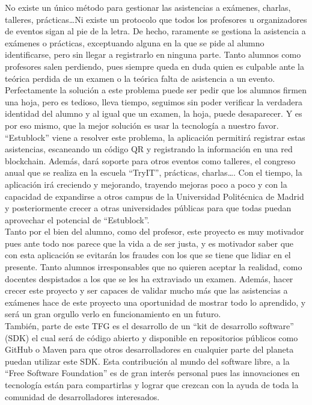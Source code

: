   No existe un único método para gestionar las asistencias a exámenes, charlas, talleres, prácticas\dots Ni existe un protocolo que todos los profesores u organizadores de eventos sigan al pie de la letra. De hecho, raramente se gestiona la asistencia a exámenes o prácticas, exceptuando alguna en la que se pide al alumno identificarse, pero sin llegar a registrarlo en ninguna parte. Tanto alumnos como profesores salen perdiendo, pues siempre queda en duda quien es culpable ante la teórica perdida de un examen o la teórica falta de asistencia a un evento. Perfectamente la solución a este problema puede ser pedir que los alumnos firmen una hoja, pero es tedioso, lleva tiempo, seguimos sin poder verificar la verdadera identidad del alumno y al igual que un examen, la hoja, puede desaparecer. Y es por eso mismo, que la mejor solución es usar la tecnología a nuestro favor. \\

``Estublock'' viene a resolver este problema, la aplicación permitirá registrar estas asistencias, escaneando un código QR y registrando la información en una red blockchain. Además, dará soporte para otros eventos como talleres, el congreso anual que se realiza en la escuela ``TryIT'', prácticas, charlas\dots. Con el tiempo, la aplicación irá creciendo y mejorando, trayendo mejoras poco a poco y con la capacidad de expandirse a otros campus de la Universidad Politécnica de Madrid y posteriormente crecer a otras universidades públicas para que todas puedan aprovechar el potencial de ``Estublock''. \\

Tanto por el bien del alumno, como del profesor, este proyecto es muy motivador pues ante todo nos parece que la vida a de ser justa, y es motivador saber que con esta aplicación se evitarán los fraudes con los que se tiene que lidiar en el presente. Tanto alumnos irresponsables que no quieren aceptar la realidad, como docentes despistados a los que se les ha extraviado un examen. Además, hacer crecer este proyecto y ser capaces de validar mucho más que las asistencias a exámenes hace de este proyecto una oportunidad de mostrar todo lo aprendido, y será un gran orgullo verlo en funcionamiento en un futuro. \\

También, parte de este TFG es el desarrollo de un ``kit de desarrollo software'' (SDK) el cual será de código abierto y disponible en repositorios públicos como GitHub o Maven para que otros desarrolladores en cualquier parte del planeta puedan utilizar este SDK. Esta contribución al mundo del software libre, a la ``Free Software Foundation'' es de gran interés personal pues las innovaciones en tecnología están para compartirlas y lograr que crezcan con la ayuda de toda la comunidad de desarrolladores interesados. \\

